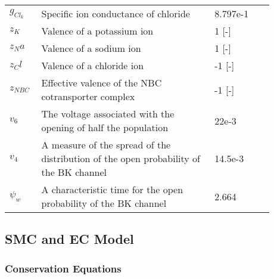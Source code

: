 \begin{table}[h!]
\centering
\begin{tabular}{| p{0.09\linewidth} | >{\footnotesize} p{0.6\linewidth} | >{\footnotesize} p{0.17\linewidth} | >{\footnotesize} p{0.02\linewidth} |}
\arrayrulecolor{lightgrey}\hline
$g_{Cl_k}$ 		& Specific ion conductance of chloride 									& 8.797e-1 \perOhmm & \cite{Ostby2009}  \\
$z_K$			& Valence of a potassium ion										& 1  [-] & \\ 
$z_Na$			& Valence of a sodium ion											& 1  [-] & \\ 
$z_Cl$			& Valence of a chloride ion											& -1 [-] & \\ 
$z_{NBC}$ 		& Effective valence of the NBC cotransporter complex 				& -1 [-] & \\
$v_{6}$			& The voltage associated with the opening of half the population		& 22e-3 \Volt  & \cite{LoesEvert}  \\
$v_{4}$			& A measure of the spread of the distribution of the open probability of the BK channel	& 14.5e-3 \Volt   &  \cite{Gonzalez1994}  
\\
$ \psi_{w}$    	& A characteristic time for the open probability of the BK channel		& 2.664 \pers & \cite{Gonzalez1994} \\

\hline
\end{tabular}
\end{table}




\newpage
\subsection{SMC and EC Model}


\subsubsection{Conservation Equations}
